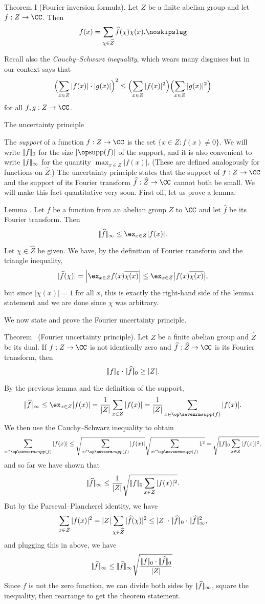 \parenproclaim Theorem I (Fourier inversion formula). Let $Z$ be a finite abelian group and let $f:Z\to \CC$.
Then
$$f(x) = \sum_{\chi\in \hat Z} \hat f(\chi) \chi(x).\noskipslug$$

Recall also the {\it Cauchy--Schwarz inequality}, which wears many disguises but in our context says that
$$ \Bigl( \sum_{x\in Z} |f(x)|\cdot |g(x)| \Bigr)^2
\le \Bigl(\sum_{x\in Z} |f(x)|^2\Bigr)\Bigl( \sum_{x\in Z} |g(x)|^2\Bigr)$$
for all $f,g : Z\to \CC$.

\advsect The uncertainty principle

The {\it support} of a function $f:Z\to \CC$ is the set $\{x\in Z : f(x)\ne 0\}$. We will write
$|\!|f|\!|_0$ for the size $|\supp(f)|$ of the support, and it is also convenient to write
$|\!|f|\!|_\infty$ for the quantity $\max_{x\in Z} |f(x)|$. (These are defined analogously for
functions on $\hat Z$.) The uncertainty principle states that
the support of $f:Z\to \CC$ and the support of its Fourier transform $\hat f:\hat Z\to \CC$ cannot both
be small. We will make this fact quantitative very soon. First off, let us prove a lemma.

\proclaim Lemma \advthm. Let $f$ be a function from an abelian group $Z$ to $\CC$ and let $\hat f$
be its Fourier transform. Then
$$\norm{\hat f}_\infty \le \ex_{x\in Z} |f(x)|.$$

\proof Let $\chi\in \hat Z$ be given. We have, by the definition of Fourier transform
and the triangle inequality,
$$|\hat f(\chi)| = \Bigl| \ex_{x\in Z} f(x) \bar{\chi(x)} \Bigr|
\le \ex_{x\in Z} \bigl| f(x) \bar{\chi(x)} \bigr|,$$
but since $|\chi(x)| = 1$ for all $x$, this is exactly the right-hand side of the lemma statement
and we are done since $\chi$ was arbitrary.\slug

We now state and prove the Fourier uncertainty principle.

\parenproclaim Theorem~{\advthm} (Fourier uncertainty principle).
Let $Z$ be a finite abelian group and $\hat Z$ be its dual. If $f : Z\to \CC$ is not identically zero
and $\hat f: \hat Z\to \CC$ is its Fourier transform, then
$$|\!|f|\!|_0 \cdot |\!|\widehat f|\!|_0 \ge |Z|.$$

\proof By the previous lemma and the definition of the support,
$$\norm{\hat f}_\infty \le \ex_{x\in Z} |f(x)| = {1\over |Z|} \sum_{x\in Z} |f(x)|
= {1\over |Z|} \sum_{x\in \smallsupp(f)} |f(x)|.$$
We then use the Cauchy--Schwarz inequality to obtain
$$\sum_{x\in \smallsupp(f)} |f(x)| \le \sqrt{\sum_{x\in \smallsupp(f)} |f(x)|}\sqrt{\sum_{x\in \smallsupp(f)} 1^2}
= \sqrt{\norm{f}_0 \sum_{x\in Z} |f(x)|^2},$$
and so far we have shown that
$$|\!|\widehat f|\!|_\infty \le {1\over |Z|} \sqrt{|\!|f|\!|_0 \sum_{x\in Z} |f(x)|^2}.$$
But by the Parseval--Plancherel identity, we have
$$\sum_{x\in Z} |f(x)|^2 = |Z| \sum_{\chi\in \widehat Z} |\widehat f(\chi)|^2
\le |Z|\cdot |\!|\widehat f|\!|_0 \cdot |\!|\widehat f|\!|_\infty^2, $$
and plugging this in above, we have
$$\norm{\hat f}_\infty \le \norm{\hat f}_\infty \sqrt{ \norm{f}_0\cdot \norm{\hat f}_0 \over |Z|}.$$
Since $f$ is not the zero function, we can divide both sides by $|\!|\widehat f|\!|_\infty$, square the
inequality, then rearrange to get the theorem statement.\slug

